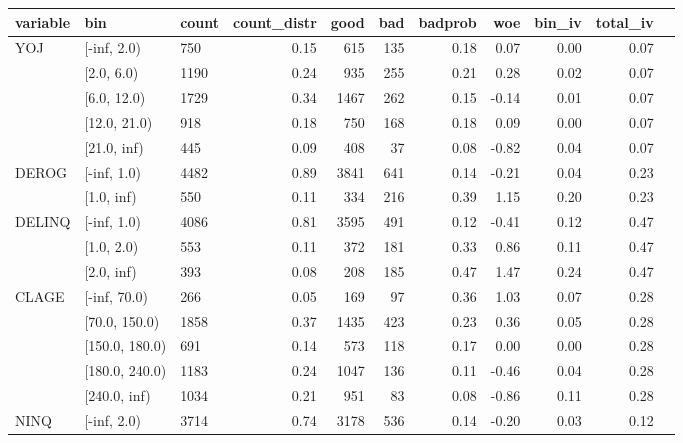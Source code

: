 \begin{landscape}
	\begin{figure}[!ht]
		\centering
		\begin{tabular}{lllrrrrrrrr}
			\toprule
			variable & bin &  count &  count\_distr &  good &  bad &   badprob &       woe &    bin\_iv &  total\_iv \\
			\midrule
			     YOJ &   [-inf, 2.0) &    750 &         0.15 &   615 &  135 &     0.18 &  0.07 &    0.00 &      0.07 \\
			      &    [2.0, 6.0) &   1190 &         0.24 &   935 &  255 &     0.21 &  0.28 &    0.02 &      0.07 \\
			      &   [6.0, 12.0) &   1729 &         0.34 &  1467 &  262 &     0.15 & -0.14 &    0.01 &      0.07 \\
			      &  [12.0, 21.0) &    918 &         0.18 &   750 &  168 &     0.18 &  0.09 &    0.00 &      0.07 \\
			      &   [21.0, inf) &    445 &         0.09 &   408 &   37 &     0.08 & -0.82 &    0.04 &      0.07 \\
			\midrule
			 DEROG &  [-inf, 1.0) &   4482 &         0.89 &  3841 &  641 &     0.14 & -0.21 &    0.04 &      0.23 \\
  			  &   [1.0, inf) &    550 &         0.11 &   334 &  216 &     0.39 &  1.15 &    0.20 &      0.23 \\
			\midrule
			  DELINQ &  [-inf, 1.0) &   4086 &         0.81 &  3595 &  491 &     0.12 & -0.41 &    0.12 &      0.47 \\
			   &   [1.0, 2.0) &    553 &         0.11 &   372 &  181 &     0.33 &  0.86 &    0.11 &      0.47 \\
			   &   [2.0, inf) &    393 &         0.08 &   208 &  185 &     0.47 &  1.47 &    0.24 &      0.47 \\
			\midrule
			   CLAGE &    [-inf, 70.0) &    266 &         0.05 &   169 &   97 &     0.36 &  1.03 &    0.07 &      0.28 \\
			    &   [70.0, 150.0) &   1858 &         0.37 &  1435 &  423 &     0.23 &  0.36 &    0.05 &      0.28 \\
			    &  [150.0, 180.0) &    691 &         0.14 &   573 &  118 &     0.17 &  0.00 &    0.00 &      0.28 \\
			    &  [180.0, 240.0) &   1183 &         0.24 &  1047 &  136 &     0.11 & -0.46 &    0.04 &      0.28 \\
			    &    [240.0, inf) &   1034 &         0.21 &   951 &   83 &     0.08 & -0.86 &    0.11 &      0.28 \\
			\midrule
			    NINQ &  [-inf, 2.0) &   3714 &         0.74 &  3178 &  536 &     0.14 & -0.20 &    0.03 &      0.12 \\

\end{tabular}
\end{figure}
\end{landscape}
